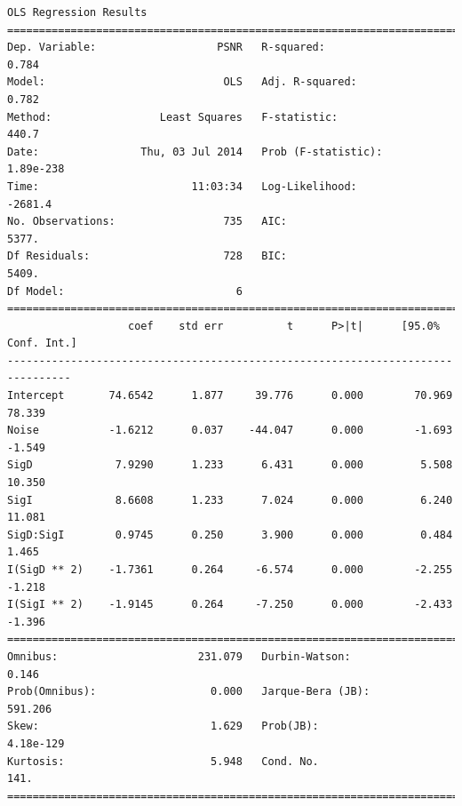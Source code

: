 \documentclass[11pt]{article}
\theoremstyle{definition}
\begin{document}
{\begin{lstlisting}[caption = Time Series 2 - Bilateral Filter OLS Model, label = {bilateralfilterseries2}]
                            OLS Regression Results                            
==============================================================================
Dep. Variable:                   PSNR   R-squared:                       0.784
Model:                            OLS   Adj. R-squared:                  0.782
Method:                 Least Squares   F-statistic:                     440.7
Date:                Thu, 03 Jul 2014   Prob (F-statistic):          1.89e-238
Time:                        11:03:34   Log-Likelihood:                -2681.4
No. Observations:                 735   AIC:                             5377.
Df Residuals:                     728   BIC:                             5409.
Df Model:                           6                                         
================================================================================
                   coef    std err          t      P>|t|      [95.0% Conf. Int.]
--------------------------------------------------------------------------------
Intercept       74.6542      1.877     39.776      0.000        70.969    78.339
Noise           -1.6212      0.037    -44.047      0.000        -1.693    -1.549
SigD             7.9290      1.233      6.431      0.000         5.508    10.350
SigI             8.6608      1.233      7.024      0.000         6.240    11.081
SigD:SigI        0.9745      0.250      3.900      0.000         0.484     1.465
I(SigD ** 2)    -1.7361      0.264     -6.574      0.000        -2.255    -1.218
I(SigI ** 2)    -1.9145      0.264     -7.250      0.000        -2.433    -1.396
==============================================================================
Omnibus:                      231.079   Durbin-Watson:                   0.146
Prob(Omnibus):                  0.000   Jarque-Bera (JB):              591.206
Skew:                           1.629   Prob(JB):                    4.18e-129
Kurtosis:                       5.948   Cond. No.                         141.
==============================================================================
\end{lstlisting}

}
\end{document}
